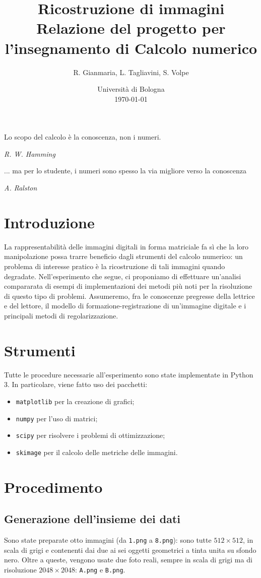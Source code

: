 \documentclass[a4paper]{article}
\title{
  Ricostruzione di immagini \\ \large Relazione del progetto per
  l'insegnamento di Calcolo numerico
}
\author{
  R. Gianmaria,
  L. Tagliavini,
  S. Volpe
}
\date{
	Universit\`a di Bologna \\
  \today
}
\begin{document}
\maketitle
\thispagestyle{empty}

\pagebreak
\tableofcontents
\pagebreak

\epigraph{Lo scopo del calcolo è la conoscenza, non i numeri.}
{\textit{R. W. Hamming}}
\epigraph{... ma per lo studente, i numeri sono spesso la via migliore verso la
conoscenza}
{\textit{A. Ralston}}

\section{Introduzione}
La rappresentabilità delle immagini digitali in forma matriciale fa sì che la
loro manipolazione possa trarre beneficio dagli strumenti del calcolo numerico:
un problema di interesse pratico è la ricostruzione di tali immagini quando
degradate. Nell'esperimento che segue, ci proponiamo di effettuare un'analisi
compararata di esempi di implementazioni dei metodi più noti per la risoluzione
di questo tipo di problemi. Assumeremo, fra le conoscenze pregresse della
lettrice e del lettore, il modello di formazione-registrazione di un'immagine
digitale e i principali metodi di regolarizzazione.

\section{Strumenti}
Tutte le procedure necessarie all'esperimento sono state implementate in Python
3. In particolare, viene fatto uso dei pacchetti:
\begin{itemize}
  \item \verb!matplotlib! per la creazione di grafici;
  \item \verb!numpy! per l'uso di matrici;
  \item \verb!scipy! per risolvere i problemi di ottimizzazione;
  \item \verb!skimage! per il calcolo delle metriche delle immagini.
\end{itemize}

\section{Procedimento}

\subsection{Generazione dell'insieme dei dati}
Sono state preparate otto immagini (da \verb!1.png! a \verb!8.png!): sono tutte
$512 \times 512$, in scala di grigi e contenenti dai due ai sei oggetti
geometrici a tinta unita su sfondo nero. Oltre a queste, vengono usate due foto
reali, sempre in scala di grigi ma di risoluzione $2048 \times 2048$:
\verb!A.png! e \verb!B.png!.
\end{document}
